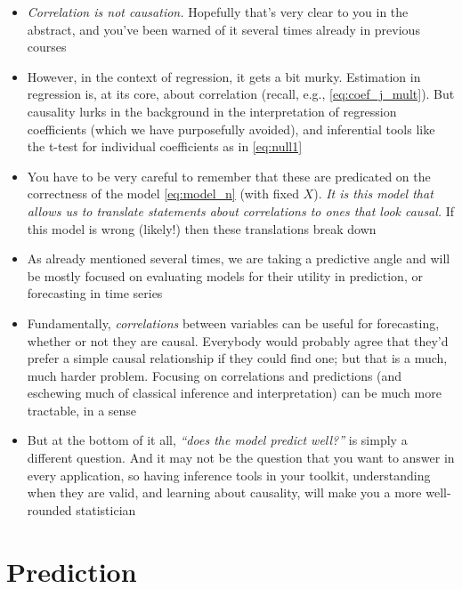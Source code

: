 \documentclass{article}
\begin{document}
\begin{itemize}
\item \emph{Correlation is not causation.} Hopefully that's very clear to you in
  the abstract, and you've been warned of it several times already in previous
  courses

\item However, in the context of regression, it gets a bit murky. Estimation in
  regression is, at its core, about correlation (recall, e.g.,
  \eqref{eq:coef_j_mult}). But causality lurks in the background in the
  interpretation of regression coefficients (which we have purposefully
  avoided), and inferential tools like the t-test for individual coefficients as
  in \eqref{eq:null1}    

\item You have to be very careful to remember that these are predicated on the
  correctness of the model \eqref{eq:model_n} (with fixed $X$). \emph{It is this
    model that allows us to translate statements about correlations to ones that
    look causal.} If this model is wrong (likely!) then these translations break
  down 

\item As already mentioned several times, we are taking a predictive angle and
  will be mostly focused on evaluating models for their utility in prediction,
  or forecasting in time series

\item Fundamentally, \emph{correlations} between variables can be useful for
  forecasting, whether or not they are causal. Everybody would probably agree
  that they'd prefer a simple causal relationship if they could find one; but
  that is a much, much harder problem. Focusing on correlations and predictions
  (and eschewing much of classical inference and interpretation) can be much
  more tractable, in a sense

\item But at the bottom of it all, \emph{``does the model predict well?''} is
  simply a different question. And it may not be the question that you want to
  answer in every application, so having inference tools in your toolkit,
  understanding when they are valid, and learning about causality, will make you
  a more well-rounded statistician
\end{itemize}

\section{Prediction}
\end{document}
